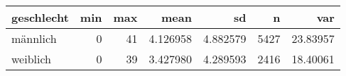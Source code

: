 
\begin{tabular}{lrrrrrr}
\toprule
geschlecht & min & max & mean & sd & n & var\\
\midrule
männlich & 0 & 41 & 4.126958 & 4.882579 & 5427 & 23.83957\\
weiblich & 0 & 39 & 3.427980 & 4.289593 & 2416 & 18.40061\\
\bottomrule
\end{tabular}